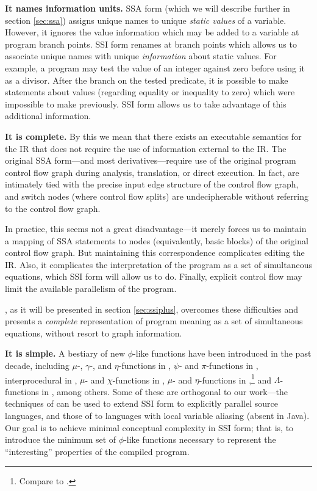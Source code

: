 \documentclass[12pt,titlepage,twoside]{article}
\begin{document}
\textbf{It names information units.}  SSA form (which we will describe
further in section \ref{sec:ssa}) assigns unique names to unique \emph{static
values} of a variable.  However, it ignores the value information
which may be added to a variable at program branch points.  SSI form
renames at branch points which allows us to associate unique names
with unique \emph{information} about static values.  For example, a
program may test the value of an integer against zero before using it
as a divisor.  After the branch on the tested predicate, it is
possible to make statements about values (regarding equality or
inequality to zero) which were impossible to make previously.  SSI
form allows us to take advantage of this additional information.

\textbf{It is complete.}\label{sec:complete}
By this we mean that there exists an
executable semantics for the IR that does not require the use of
information external to the IR.  The original SSA form---and most
derivatives---require use of the original program control flow graph
during analysis, translation, or direct execution.  In fact,
 are intimately tied with the precise input edge
structure of the control flow graph, and switch nodes (where control
flow splits) are undecipherable without referring to the control flow
graph.

In practice, this seems not a great disadvantage---it merely forces us to
maintain a mapping of SSA statements to nodes (equivalently, basic
blocks) of the original control flow graph.  But maintaining this
correspondence complicates editing the IR.  Also, it complicates the
interpretation of the program as a set of simultaneous equations,
which SSI form will allow us to do.  Finally, explicit control flow
may limit the available parallelism of the program.

\ssiplus, as it will be presented in section \ref{sec:ssiplus},
overcomes these difficulties and presents a \emph{complete}
representation of program meaning as a set of simultaneous equations,
without resort to graph information.

\textbf{It is simple.}  A bestiary of new $\phi$-like functions have
been introduced in the past decade, including
$\mu$-, $\gamma$-, and $\eta$-functions in \cite{ballance90:pdw,tu95:gssa},
$\psi$- and $\pi$-functions in \cite{lee99:parssa},
interprocedural  in \cite{liao99:issa},
$\mu$- and $\chi$-functions in \cite{chow96:hssa},
$\mu$- and $\eta$-functions in \cite{gerlek95:inductssa},\footnote{Compare to
\cite{ballance90:pdw,tu95:gssa}.} and $\Lambda$-functions in \cite{lo98:ssu},
among others.%
Some of these are orthogonal to our work---the techniques of
\cite{lee99:parssa} can be used to extend SSI form to explicitly
parallel source languages, and those of \cite{chow96:hssa} to
languages with local variable aliasing (absent in Java).  Our goal is
to achieve minimal conceptual complexity in SSI form; that is, to
introduce the minimum set of $\phi$-like functions necessary to
represent the ``interesting'' properties of the compiled program.
\end{document}
